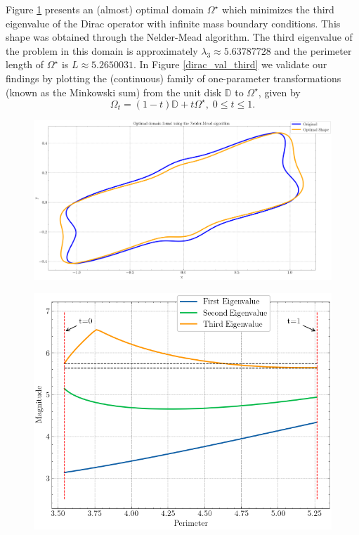 Figure \ref{dirac_nelder_mead_domain} presents an (almost) optimal domain \(\Omega^\star\) which minimizes the third eigenvalue of the Dirac operator with infinite mass boundary conditions. This shape was obtained through the Nelder-Mead algorithm. The third eigenvalue of the problem in this domain is approximately \(\lambda_3 \approx 5.63787728\) and the perimeter length of \(\Omega^\star\) is \(L \approx 5.2650031\). In Figure \ref{dirac_val_third} we validate our findings by plotting the (continuous) family of one-parameter transformations (known as the Minkowski sum) from the unit disk \(\mathbb{D}\) to \(\Omega^\star\), given by
\[
   \Omega_t = (1-t)\mathbb{D} + t \Omega^\star, \; 0 \leq t \leq 1.
\]
\begin{figure}[!htb]
    \centering
    \begin{minipage}{.5\textwidth}
        \centering
        \includegraphics[width=0.9\linewidth]{Images/Dirac/smooth/nelder_mead_optimal.png}
        \captionsetup{width=0.8\linewidth} %
        \label{dirac_nelder_mead_domain}
    \end{minipage}%
    \hfill
    \begin{minipage}{.5\textwidth}
        \centering
        \includegraphics[width=0.8\linewidth]{Images/Dirac/smooth/dirac_val_third.png}

\end{minipage}
\end{figure}
